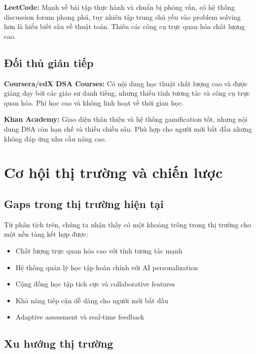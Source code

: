 \textbf{LeetCode:} Mạnh về bài tập thực hành và chuẩn bị phỏng vấn, có hệ thống discussion forum phong phú, tuy nhiên tập trung chủ yếu vào problem solving hơn là hiểu biết sâu về thuật toán. Thiếu các công cụ trực quan hóa chất lượng cao.

\subsection{Đối thủ gián tiếp}
\label{subsec:indirect-competitors}

\textbf{Coursera/edX DSA Courses:} Có nội dung học thuật chất lượng cao và được giảng dạy bởi các giáo sư danh tiếng, nhưng thiếu tính tương tác và công cụ trực quan hóa. Phí học cao và không linh hoạt về thời gian học.

\textbf{Khan Academy:} Giao diện thân thiện và hệ thống gamification tốt, nhưng nội dung DSA còn hạn chế và thiếu chiều sâu. Phù hợp cho người mới bắt đầu nhưng không đáp ứng nhu cầu nâng cao.

\section{Cơ hội thị trường và chiến lược}
\label{sec:market-opportunity}

\subsection{Gaps trong thị trường hiện tại}
\label{subsec:market-gaps}

Từ phân tích trên, chúng ta nhận thấy có một khoảng trống trong thị trường cho một nền tảng kết hợp được:
\begin{itemize}
\item Chất lượng trực quan hóa cao với tính tương tác mạnh
\item Hệ thống quản lý học tập hoàn chỉnh với AI personalization
\item Cộng đồng học tập tích cực và collaborative features
\item Khả năng tiếp cận dễ dàng cho người mới bắt đầu
\item Adaptive assessment và real-time feedback
\end{itemize}

\subsection{Xu hướng thị trường}
\label{subsec:market-trends}

